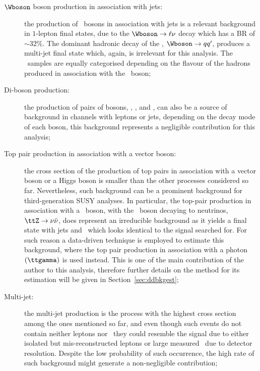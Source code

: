 \begin{description}
			\item [$\mathbf{\Wboson}$ boson production in association with jets:] the production of \Wboson\ bosons in association with jets is a relevant background in $1$-lepton final states, due to the $\Wboson \to \ell\nu$ decay which has a \ac{BR} of $\sim 32\%.$ The dominant hadronic decay of the \Wboson, $\Wboson \to qq'$, produces a multi-jet final state which, again, is irrelevant for this analysis. The \Wjets\ samples are equally categorised depending on the flavour of the hadrons produced in association with the \Wboson\ boson;

			\item [Di-boson production:] the production of pairs of bosons, \Wboson\Wboson, \Wboson\Zboson, and \Zboson\Zboson, can also be a source of background in channels with leptons or jets, depending on the decay mode of each boson, this background represents a negligible contribution for this analysis;

			\item [Top pair production in association with a vector boson:] the cross section of the production of top pairs in association with a vector boson or a Higgs boson is smaller than the other processes considered so far. Nevertheless, such background can be a prominent background for third-generation \ac{SUSY} analyses. In particular, the top-pair production in association with a \Zboson\ boson, with the \Zboson\ boson decaying to neutrinos, $\ttZ \to \nu \bar{\nu}$, does represent an irreducible background as it yields a final state with jets and \met\ which looks identical to the signal searched for. For such reason a data-driven technique is employed to estimate this background, where the top pair production in association with a photon $\left(\ttgamma\right)$ is used instead. This is one of the main contribution of the author to this analysis, therefore further details on the method for its estimation will be given in Section~\ref{sec:ddbkgest}; 

			\item [Multi-jet:] the multi-jet production is the process with the highest cross section among the ones mentioned so far, and even though such events do not contain neither leptons nor \met\ they could resemble the signal due to either isolated but mis-reconstructed leptons or large measured \met\ due to detector resolution. Despite the low probability of such occurrence, the high rate of such background might generate a non-negligible contribution;
		\end{description}

